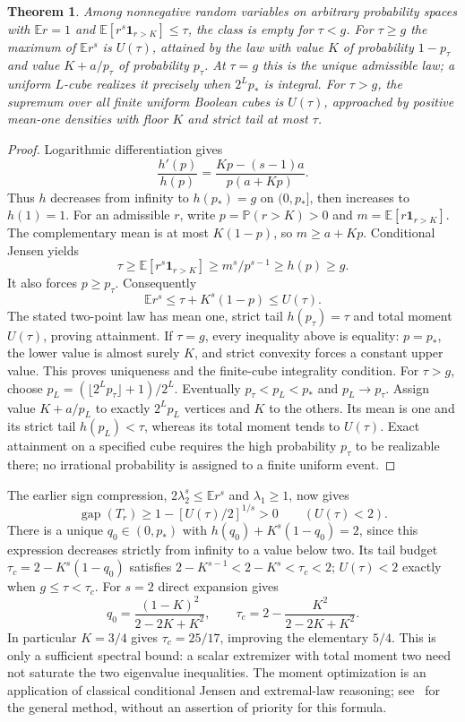 \documentclass[11pt]{article}
\newtheorem{theorem}{Theorem}
\newcommand{\gap}{\operatorname{gap}}
\begin{document}
\begin{theorem}\label{thm:scalar-envelope}
Among nonnegative random variables on arbitrary probability spaces with
$\mathbb Er=1$ and $\mathbb E[r^s\mathbf1_{r>K}]\le\tau$, the class is
empty for $\tau<g$. For $\tau\ge g$ the maximum of $\mathbb Er^s$ is
$U(\tau)$, attained by the law with value $K$ of probability $1-p_\tau$
and value $K+a/p_\tau$ of probability $p_\tau$.
At $\tau=g$ this is the unique admissible law; a uniform $L$-cube realizes
it precisely when $2^Lp_*$ is integral. For $\tau>g$, the supremum over
all finite uniform Boolean cubes is $U(\tau)$, approached by positive
mean-one densities with floor $K$ and strict tail at most $\tau$.
\end{theorem}
\begin{proof}
Logarithmic differentiation gives
\[
 \frac{h'(p)}{h(p)}=\frac{Kp-(s-1)a}{p(a+Kp)}.
\]
Thus $h$ decreases from infinity to $h(p_*)=g$ on $(0,p_*]$, then
increases to $h(1)=1$. For an admissible $r$, write
$p=\mathbb P(r>K)>0$ and $m=\mathbb E[r\mathbf1_{r>K}]$.
The complementary mean is at most $K(1-p)$, so $m\ge a+Kp$.
Conditional Jensen yields
\[
 \tau\ge\mathbb E[r^s\mathbf1_{r>K}]
 \ge m^s/p^{s-1}\ge h(p)\ge g.
\]
It also forces $p\ge p_\tau$. Consequently
\[
 \mathbb Er^s\le\tau+K^s(1-p)\le U(\tau).
\]
The stated two-point law has mean one, strict tail $h(p_\tau)=\tau$
and total moment $U(\tau)$, proving attainment. If $\tau=g$, every
inequality above is equality: $p=p_*$, the lower value is almost surely
$K$, and strict convexity forces a constant upper value. This proves
uniqueness and the finite-cube integrality condition.
For $\tau>g$, choose
$p_L=(\lfloor2^Lp_\tau\rfloor+1)/2^L$. Eventually
$p_\tau<p_L<p_*$ and $p_L\to p_\tau$. Assign value $K+a/p_L$ to
exactly $2^Lp_L$ vertices and $K$ to the others. Its mean is one and its
strict tail $h(p_L)<\tau$, whereas its total moment tends to $U(\tau)$.
Exact attainment on a specified cube requires the high probability
$p_\tau$ to be realizable there; no irrational probability is assigned
to a finite uniform event.
\end{proof}

The earlier sign compression, $2\lambda_2^s\le\mathbb Er^s$ and
$\lambda_1\ge1$, now gives
\[
 \gap(T_r)\ge1-[U(\tau)/2]^{1/s}>0\qquad(U(\tau)<2).
\]
There is a unique $q_0\in(0,p_*)$ with
$h(q_0)+K^s(1-q_0)=2$, since this expression decreases strictly from
infinity to a value below two. Its tail budget
$\tau_c=2-K^s(1-q_0)$ satisfies
$2-K^{s-1}<2-K^s<\tau_c<2$; $U(\tau)<2$ exactly when
$g\le\tau<\tau_c$. For $s=2$ direct expansion gives
\[
 q_0=\frac{(1-K)^2}{2-2K+K^2},\qquad
 \tau_c=2-\frac{K^2}{2-2K+K^2}.
\]
In particular $K=3/4$ gives $\tau_c=25/17$, improving the elementary
$5/4$. This is only a sufficient spectral bound: a scalar extremizer
with total moment two need not saturate the two eigenvalue inequalities.
The moment optimization is an application of classical conditional
Jensen and extremal-law reasoning; see~\cite{BertsimasPopescu} for the
general method, without an assertion of priority for this formula.
\end{document}
